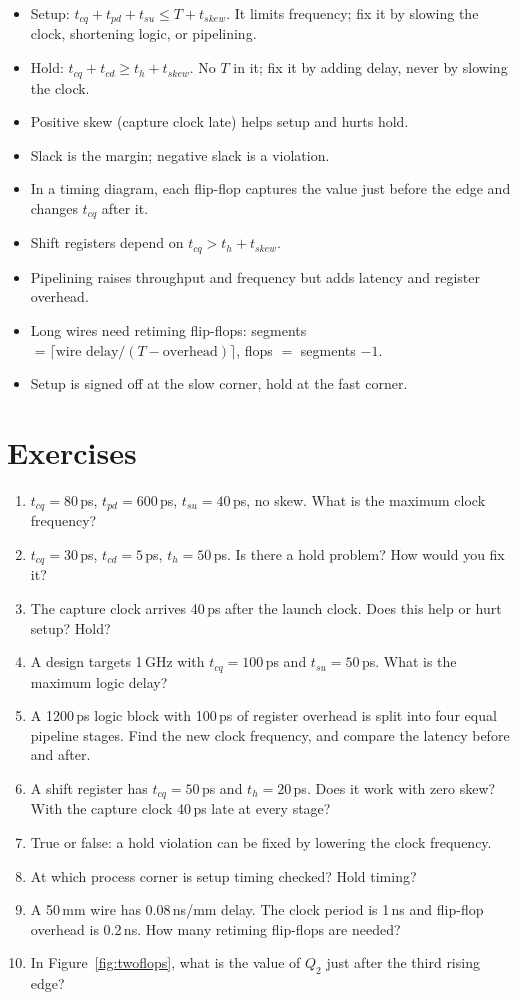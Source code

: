 \begin{itemize}
  \item Setup: $t_{cq} + t_{pd} + t_{su} \le T + t_{skew}$. It limits frequency; fix it by slowing the clock, shortening logic, or pipelining.
  \item Hold: $t_{cq} + t_{cd} \ge t_h + t_{skew}$. No $T$ in it; fix it by adding delay, never by slowing the clock.
  \item Positive skew (capture clock late) helps setup and hurts hold.
  \item Slack is the margin; negative slack is a violation.
  \item In a timing diagram, each flip-flop captures the value just before the edge and changes $t_{cq}$ after it.
  \item Shift registers depend on $t_{cq} > t_h + t_{skew}$.
  \item Pipelining raises throughput and frequency but adds latency and register overhead.
  \item Long wires need retiming flip-flops: segments $= \lceil \text{wire delay} / (T - \text{overhead}) \rceil$, flops $=$ segments $- 1$.
  \item Setup is signed off at the slow corner, hold at the fast corner.
\end{itemize}

\section{Exercises}

\begin{enumerate}
  \item $t_{cq} = 80$\,ps, $t_{pd} = 600$\,ps, $t_{su} = 40$\,ps, no skew. What is the maximum clock frequency?
  \item $t_{cq} = 30$\,ps, $t_{cd} = 5$\,ps, $t_h = 50$\,ps. Is there a hold problem? How would you fix it?
  \item The capture clock arrives 40\,ps after the launch clock. Does this help or hurt setup? Hold?
  \item A design targets 1\,GHz with $t_{cq} = 100$\,ps and $t_{su} = 50$\,ps. What is the maximum logic delay?
  \item A 1200\,ps logic block with 100\,ps of register overhead is split into four equal pipeline stages. Find the new clock frequency, and compare the latency before and after.
  \item A shift register has $t_{cq} = 50$\,ps and $t_h = 20$\,ps. Does it work with zero skew? With the capture clock 40\,ps late at every stage?
  \item True or false: a hold violation can be fixed by lowering the clock frequency.
  \item At which process corner is setup timing checked? Hold timing?
  \item A 50\,mm wire has 0.08\,ns/mm delay. The clock period is 1\,ns and flip-flop overhead is 0.2\,ns. How many retiming flip-flops are needed?
  \item In Figure~\ref{fig:twoflops}, what is the value of $Q_2$ just after the third rising edge?
\end{enumerate}

